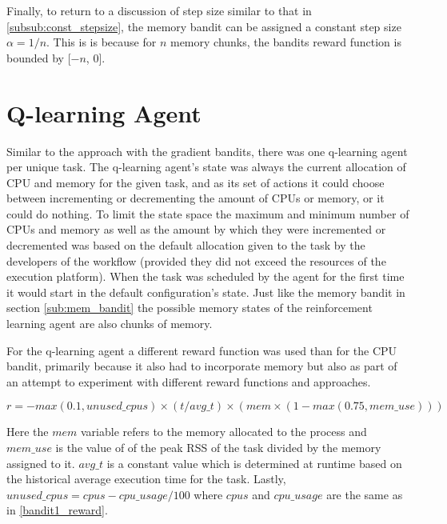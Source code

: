 Finally, to return to a discussion of step size similar to that in \ref{subsub:const_stepsize}, the memory bandit can be assigned a constant step size $\alpha = 1/n$. This is is because for $n$ memory chunks, the bandits reward function is bounded by [$-n$, 0]. 


\section{Q-learning Agent}
\label{sec:q_agent}

Similar to the approach with the gradient bandits, there was one q-learning agent per unique task. The q-learning agent’s state was always the current allocation of CPU and memory for the given task, and as its set of actions it could choose between incrementing or decrementing the amount of CPUs or memory, or it could do nothing. To limit the state space the maximum and minimum number of CPUs and memory as well as the amount by which they were incremented or decremented was based on the default allocation given to the task by the developers of the workflow (provided they did not exceed the resources of the execution platform). When the task was scheduled by the agent for the first time it would start in the default configuration’s state. Just like the memory bandit in section \ref{sub:mem_bandit} the possible memory states of the reinforcement learning agent are also chunks of memory. 

For the q-learning agent a different reward function was used than for the CPU bandit, primarily because it also had to incorporate memory but also as part of an attempt to experiment with different reward functions and approaches. 

\begin{equation}
\label{q_agent_1_reward}
r = -max(0.1,unused\_cpus) \times (t/avg\_t) \times (mem\times (1 - max(0.75,mem\_use)))
\end{equation}

Here the $mem$ variable refers to the memory allocated to the process and $mem\_use$ is the value of of the peak RSS of the task divided by the memory assigned to it. $avg\_t$ is a constant value which is determined at runtime based on the historical average execution time for the task. Lastly, $unused\_cpus = cpus - cpu\_usage/100$ where $cpus$ and $cpu\_usage$ are the same as in \ref{bandit1_reward}. 

